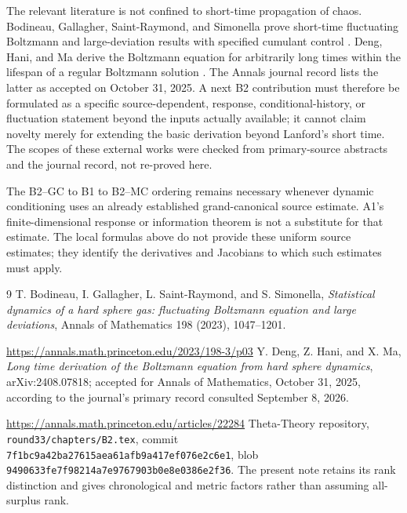 \documentclass[11pt,reqno]{amsart}
\numberwithin{equation}{section}
\theoremstyle{remark}\newtheorem{remark}[theorem]{Remark}
\begin{document}
The relevant literature is not confined to short-time propagation of chaos. Bodineau, Gallagher, Saint-Raymond, and Simonella prove short-time fluctuating Boltzmann and large-deviation results with specified cumulant control \cite{BGSS}. Deng, Hani, and Ma derive the Boltzmann equation for arbitrarily long times within the lifespan of a regular Boltzmann solution \cite{DHM}. The Annals journal record lists the latter as accepted on October 31, 2025. A next B2 contribution must therefore be formulated as a specific source-dependent, response, conditional-history, or fluctuation statement beyond the inputs actually available; it cannot claim novelty merely for extending the basic derivation beyond Lanford's short time. The scopes of these external works were checked from primary-source abstracts and the journal record, not re-proved here.

The B2--GC to B1 to B2--MC ordering remains necessary whenever dynamic conditioning uses an already established grand-canonical source estimate. A1's finite-dimensional response or information theorem is not a substitute for that estimate. The local formulas above do not provide these uniform source estimates; they identify the derivatives and Jacobians to which such estimates must apply.

\begin{thebibliography}{9}
 T. Bodineau, I. Gallagher, L. Saint-Raymond, and S. Simonella, \emph{Statistical dynamics of a hard sphere gas: fluctuating Boltzmann equation and large deviations}, Annals of Mathematics 198 (2023), 1047--1201.\par\url{https://annals.math.princeton.edu/2023/198-3/p03}
 Y. Deng, Z. Hani, and X. Ma, \emph{Long time derivation of the Boltzmann equation from hard sphere dynamics}, arXiv:2408.07818; accepted for Annals of Mathematics, October 31, 2025, according to the journal's primary record consulted September 8, 2026.\par\url{https://annals.math.princeton.edu/articles/22284}
 Theta-Theory repository, \texttt{round33/chapters/B2.tex}, commit \texttt{7f1bc9a42ba27615aea61afb9a417ef076e2c6e1}, blob \texttt{9490633fe7f98214a7e9767903b0e8e0386e2f36}. The present note retains its rank distinction and gives chronological and metric factors rather than assuming all-surplus rank.
\end{thebibliography}
\end{document}
